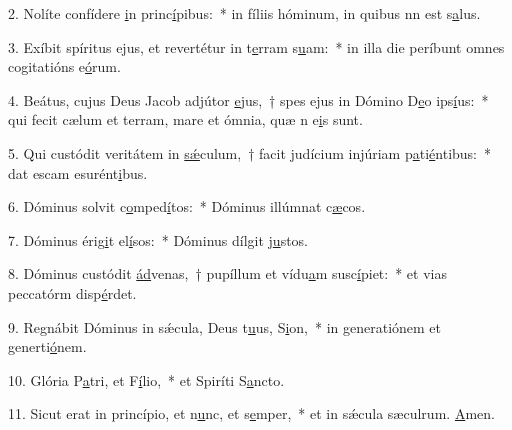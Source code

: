 2. Nolíte confídere \uline{i}n princ\uline{í}pibus:~* in fíliis hóminum, in quibus nn est s\uline{a}lus.\par 
3. Exíbit spíritus ejus, et revertétur in t\uline{e}rram s\uline{u}am:~* in illa die períbunt omnes cogitatións e\uline{ó}rum.\par 
4. Beátus, cujus Deus Jacob adjútor \uline{e}jus,~† spes ejus in Dómino D\uline{e}o ips\uline{í}us:~* qui fecit cælum et terram, mare et ómnia, quæ n e\uline{i}s sunt.\par 
5. Qui custódit veritátem in \uline{sǽ}culum,~† facit judícium injúriam p\uline{a}ti\uline{é}ntibus:~* dat escam esurént\uline{i}bus.\par 
6. Dóminus solvit c\uline{o}mped\uline{í}tos:~* Dóminus illúmnat c\uline{æ}cos.\par 
7. Dóminus érig\uline{i}t el\uline{í}sos:~* Dóminus dílgit j\uline{u}stos.\par 
8. Dóminus custódit \uline{ád}venas,~† pupíllum et vídu\uline{a}m susc\uline{í}piet:~* et vias peccatórm disp\uline{é}rdet.\par 
9. Regnábit Dóminus in sǽcula, Deus t\uline{u}us, S\uline{i}on,~* in generatiónem et generti\uline{ó}nem.\par 
10. Glória P\uline{a}tri, et F\uline{í}lio,~* et Spiríti S\uline{a}ncto.\par 
11. Sicut erat in princípio, et n\uline{u}nc, et s\uline{e}mper,~* et in sǽcula sæculrum. \uline{A}men.\par 
